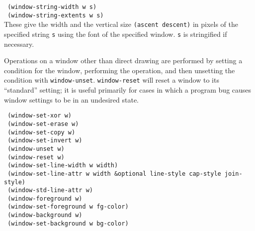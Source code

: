 {\tt \hspace*{0.5in} (window-string-width w s)} \\
{\tt \hspace*{0.5in} (window-string-extents w s)} \\
These give the width and the vertical size {\tt (ascent descent)} in pixels
of the specified string {\tt s} using the font of the specified window.
{\tt s} is stringified if necessary.

Operations on a window other than direct drawing are performed by
setting a condition for the window, performing the operation, and then
unsetting the condition with {\tt window-unset}.  {\tt window-reset}
will reset a window to its ``standard'' setting; it is useful primarily
for cases in which a program bug causes window settings to be in an
undesired state.

\vspace{-0.1in}
{\tt \hspace*{0.5in} (window-set-xor w)} \\
{\tt \hspace*{0.5in} (window-set-erase w)} \\
{\tt \hspace*{0.5in} (window-set-copy w)} \\
{\tt \hspace*{0.5in} (window-set-invert w)} \\
{\tt \hspace*{0.5in} (window-unset w)} \\
{\tt \hspace*{0.5in} (window-reset w)} \\

{\tt \hspace*{0.5in} (window-set-line-width w width)} \\
{\tt \hspace*{0.5in} (window-set-line-attr w width \&optional line-style cap-style join-style)} \\
{\tt \hspace*{0.5in} (window-std-line-attr w)} \\

{\tt \hspace*{0.5in} (window-foreground w)} \\
{\tt \hspace*{0.5in} (window-set-foreground w fg-color)} \\
{\tt \hspace*{0.5in} (window-background w)} \\
{\tt \hspace*{0.5in} (window-set-background w bg-color)} \\


